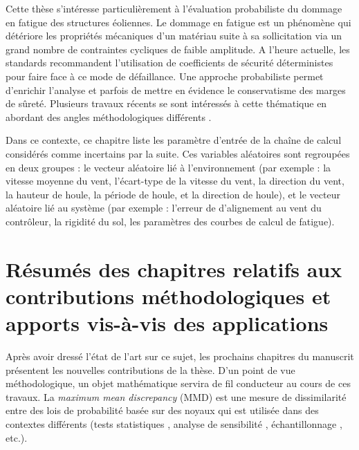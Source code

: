 Cette thèse s'int\'{e}resse particulièrement à l'\'{e}valuation probabiliste du dommage en fatigue des structures \'{e}oliennes. 
Le dommage en fatigue est un ph\'{e}nomène qui d\'{e}t\'{e}riore les propri\'{e}t\'{e}s m\'{e}caniques d'un mat\'{e}riau suite à sa sollicitation via un grand nombre de contraintes cycliques de faible amplitude. 
A l'heure actuelle, les standards \citep{iec_2019,dnv_loads_2016} recommandent l'utilisation de coefficients de s\'{e}curit\'{e} d\'{e}terministes pour faire face à ce mode de d\'{e}faillance. 
Une approche probabiliste permet d'enrichir l'analyse et parfois de mettre en \'{e}vidence le conservatisme des marges de sûret\'{e}. 
Plusieurs travaux r\'{e}cents se sont int\'{e}ress\'{e}s à cette th\'{e}matique en abordant des angles m\'{e}thodologiques diff\'{e}rents \citep{huchet_2018,lataniotis_2019,cousin_2021,petrovska_2022}.

Dans ce contexte, ce chapitre liste les paramètre d'entr\'{e}e de la chaîne de calcul consid\'{e}r\'{e}s comme incertains par la suite. 
Ces variables al\'{e}atoires sont regroup\'{e}es en deux groupes : le vecteur al\'{e}atoire li\'{e} à l'environnement (par exemple : la vitesse moyenne du vent, l'\'{e}cart-type de la vitesse du vent, la direction du vent, la hauteur de houle, la p\'{e}riode de houle, et la direction de houle), et le vecteur al\'{e}atoire li\'{e} au système (par exemple : l'erreur de d'alignement au vent du contrôleur, la rigidit\'{e} du sol, les paramètres des courbes de calcul de fatigue).


\section*{R\'{e}sum\'{e}s des chapitres relatifs aux contributions m\'{e}thodologiques et apports vis-à-vis des applications}

Après avoir dress\'{e} l'\'{e}tat de l'art sur ce sujet, les prochains chapitres du manuscrit pr\'{e}sentent les nouvelles contributions de la thèse. 
D'un point de vue m\'{e}thodologique, un objet math\'{e}matique servira de fil conducteur au cours de ces travaux. 
La \textit{maximum mean discrepancy} (MMD) \citep{gretton_2006} est une mesure de dissimilarit\'{e} entre des lois de probabilit\'{e} bas\'{e}e sur des noyaux qui est utilis\'{e}e dans des contextes diff\'{e}rents (tests statistiques \citealp{gretton_2006}, analyse de sensibilit\'{e} \citealp{daveiga_2015}, \'{e}chantillonnage \citealp{pronzato_zhigljavsky_2020}, etc.).

